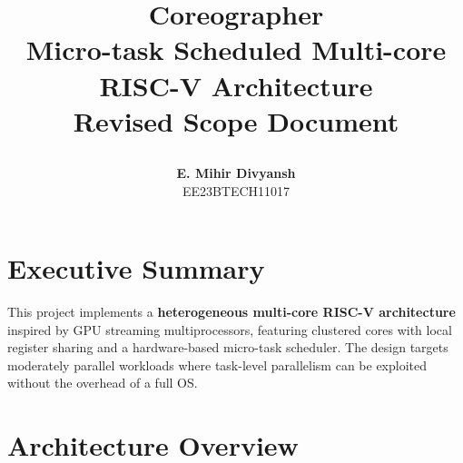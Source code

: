 \documentclass[a4paper,12pt]{article}
\title{
  \vspace{-1.5cm}
  \begin{tcolorbox}[
    colback=primaryblue,
    colframe=primaryblue,
    arc=3mm,
    boxrule=0pt,
    left=10pt,
    right=10pt,
    top=15pt,
    bottom=15pt
  ]
  \color{white}
  \LARGE\bfseries Coreographer \\[0.2em]
  \large Micro-task Scheduled Multi-core RISC-V Architecture \\[0.1em]
  \normalsize Revised Scope Document
  \end{tcolorbox}
  \vspace{-0.5cm}
}
\author{
  \begin{tcolorbox}[
    colback=lightgray,
    colframe=lightgray,
    arc=2mm,
    boxrule=0pt,
    left=8pt,
    right=8pt,
    top=8pt,
    bottom=8pt
  ]
  \color{darkgray}
  \textbf{E. Mihir Divyansh} \\ 
  \small EE23BTECH11017
  \end{tcolorbox}
}
\date{}
\begin{document}
\maketitle
\thispagestyle{fancy}

\section*{Executive Summary}

\begin{tcolorbox}[
  colback=lightblue!30,
  colframe=accentblue,
  arc=2mm,
  boxrule=1.5pt,
  left=10pt,
  right=10pt,
  top=10pt,
  bottom=10pt
]
This project implements a \textbf{heterogeneous multi-core RISC-V architecture} inspired by GPU streaming multiprocessors, featuring clustered cores with local register sharing and a hardware-based micro-task scheduler. The design targets moderately parallel workloads where task-level parallelism can be exploited without the overhead of a full OS.
\end{tcolorbox}

\section*{Architecture Overview}
\end{document}
